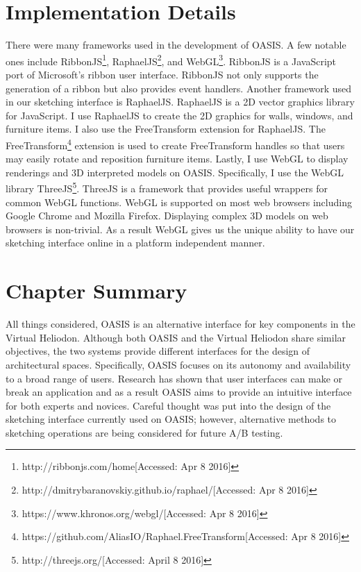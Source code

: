 \section{Implementation Details}
There were many frameworks used in the development of OASIS.  A few notable ones include RibbonJS\footnote{http://ribbonjs.com/home[Accessed: Apr 8 2016]}, RaphaelJS\footnote{http://dmitrybaranovskiy.github.io/raphael/[Accessed: Apr 8 2016]}, and WebGL\footnote{https://www.khronos.org/webgl/[Accessed: Apr 8 2016]}.  RibbonJS is a JavaScript port of Microsoft's ribbon user interface.  RibbonJS not only supports the generation of a ribbon but also provides event handlers.  Another framework used in our sketching interface is RaphaelJS.  RaphaelJS is a 2D vector graphics library for JavaScript.  I use RaphaelJS to create the 2D graphics for walls, windows, and furniture items.  I also use the FreeTransform extension for RaphaelJS.  The FreeTransform\footnote{https://github.com/AliasIO/Raphael.FreeTransform[Accessed: Apr 8 2016]} extension is used to create FreeTransform handles so that users may easily rotate and reposition furniture items.  Lastly, I use WebGL to display renderings and 3D interpreted models on OASIS.  Specifically, I use the WebGL library ThreeJS\footnote{http://threejs.org/[Accessed: April 8 2016]}.  ThreeJS is a framework that provides useful wrappers for common WebGL functions.  WebGL is supported on most web browsers including Google Chrome and Mozilla Firefox.  Displaying complex 3D models on web browsers is non-trivial.  As a result WebGL gives us the unique ability to have our sketching interface online in a platform independent manner.  \\

\section{Chapter Summary}
All things considered, OASIS is an alternative interface for key components in the Virtual Heliodon. Although both OASIS and the Virtual Heliodon share similar objectives, the two systems provide different interfaces for the design of architectural spaces. Specifically, OASIS focuses on its autonomy and availability to a broad range of users.  Research has shown that user interfaces can make or break an application and as a result OASIS aims to provide an intuitive interface for both experts and novices. Careful thought was put into the design of the sketching interface currently used on OASIS; however, alternative methods to sketching operations are being considered for future A/B testing. \\

